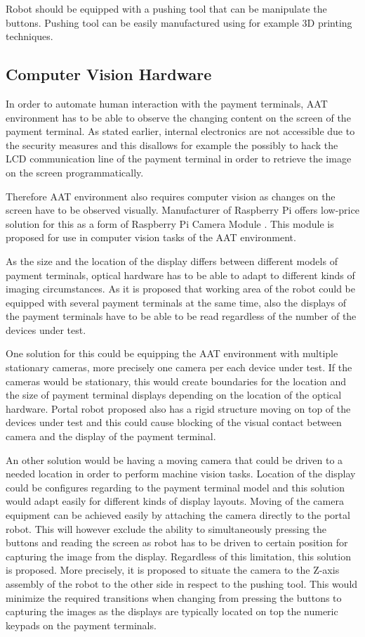 Robot should be equipped with a pushing tool that can be manipulate the buttons. Pushing tool can be easily manufactured using for example 3D printing techniques.

\FloatBarrier
\subsection{Computer Vision Hardware}
\label{subsection:computer vision hardware}

In order to automate human interaction with the payment terminals, AAT environment has to be able to observe the changing content on the screen of the payment terminal. As stated earlier, internal electronics are not accessible due to the security measures and this disallows for example the possibly to hack the LCD communication line of the payment terminal in order to retrieve the image on the screen programmatically.

Therefore AAT environment also requires computer vision as changes on the screen have to be observed visually. Manufacturer of Raspberry Pi offers low-price solution for this as a form of Raspberry Pi Camera Module \emph{\citep{raspberry_camera}}. This module is proposed for use in computer vision tasks of the AAT environment.

As the size and the location of the display differs between different models of payment terminals, optical hardware has to be able to adapt to different kinds of imaging circumstances. As it is proposed that working area of the robot could be equipped with several payment terminals at the same time, also the displays of the payment terminals have to be able to be read regardless of the number of the devices under test.

One solution for this could be equipping the AAT environment with multiple stationary cameras, more precisely one camera per each device under test. If the cameras would be stationary, this would create boundaries for the location and the size of payment terminal displays depending on the location of the optical hardware. Portal robot proposed also has a rigid structure moving on top of the devices under test and this could cause blocking of the visual contact between camera and the display of the payment terminal.

An other solution would be having a moving camera that could be driven to a needed location in order to perform machine vision tasks. Location of the display could be configures regarding to the payment terminal model and this solution would adapt easily for different kinds of display layouts. Moving of the camera equipment can be achieved easily by attaching the camera directly to the portal robot. This will however exclude the ability to simultaneously pressing the buttons and reading the screen as robot has to be driven to certain position for capturing the image from the display. Regardless of this limitation, this solution is proposed. More precisely, it is proposed to situate the camera to the Z-axis assembly of the robot to the other side in respect to the pushing tool. This would minimize the required transitions when changing from pressing the buttons to capturing the images as the displays are typically located on top the numeric keypads on the payment terminals.

